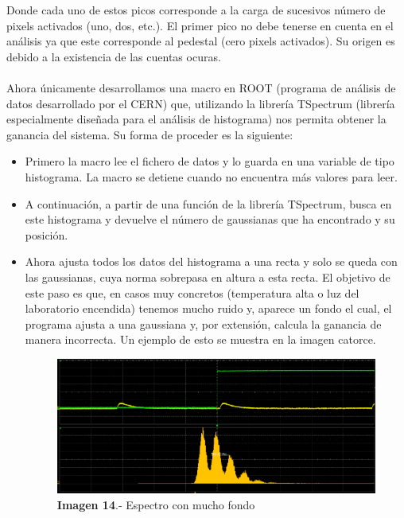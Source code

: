 \documentclass[11pt, a4paper]{article}
\begin{document}
Donde cada uno de estos picos corresponde a la carga de sucesivos número de pixels activados (uno, dos, etc.). El primer pico no debe tenerse en cuenta en el análisis ya que este corresponde al pedestal (cero pixels activados). Su origen es debido a la existencia de las cuentas ocuras.
 
\paragraph {}  
Ahora únicamente desarrollamos una macro en ROOT (programa de análisis de datos desarrollado por el CERN) que, utilizando la librería TSpectrum (librería especialmente diseñada para el análisis de histograma) nos permita obtener la ganancia del sistema. Su forma de proceder es la siguiente:
\begin{itemize}
\item {} Primero la macro lee el fichero de datos y lo guarda en una variable de tipo histograma. La macro se detiene cuando no encuentra más valores para leer.

\item {} A continuación, a partir de una función de la librería TSpectrum, busca en este histograma y devuelve el número de gaussianas que ha encontrado y su posición.

\item {} Ahora ajusta todos los datos del histograma a una recta y solo se queda con las gaussianas, cuya norma sobrepasa en altura a esta recta. El objetivo de este paso es que, en casos muy concretos (temperatura alta o luz del laboratorio encendida) tenemos mucho ruido y, aparece un fondo el cual, el programa ajusta a una gaussiana y, por extensión, calcula la ganancia de manera incorrecta. Un ejemplo de esto se muestra en la imagen catorce.

\begin{figure}[hbtp]
\centering
\includegraphics[scale=0.2]{fondogaussiano.png}
\caption{\textbf{Imagen 14}.- Espectro con mucho fondo}
\end{figure}


\end{itemize}
\end{document}
